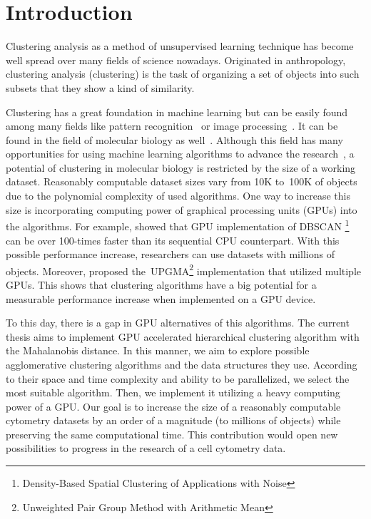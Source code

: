 \chapter*{Introduction}


Clustering analysis as a method of unsupervised learning technique has become well spread over many fields of science nowadays. Originated in anthropology, clustering analysis (clustering) is the task of organizing a set of objects into such subsets that they show a kind of similarity. 

Clustering has a great foundation in machine learning but can be easily found among many fields like pattern recognition~\cite{pare} or image processing~\cite{sathya2011image}. It can be found in the field of molecular biology as well~\cite{Nugent2010}. Although this field has many opportunities for using machine learning algorithms to advance the research~\cite{btaa091}, a potential of clustering in molecular biology is restricted by the size of a working dataset. Reasonably computable dataset sizes vary from 10K to~100K of objects due to the polynomial complexity of used algorithms. One way to increase this size is incorporating computing power of graphical processing units (GPUs) into the algorithms. For example, \citet{andrade2013g} showed that GPU implementation of DBSCAN \footnote{Density-Based Spatial Clustering of Applications with Noise} can be over 100-times faster than its sequential CPU counterpart. With this possible performance increase, researchers can use datasets with millions of objects. Moreover, \citet{hua2017mgupgma} proposed the~UPGMA\footnote{Unweighted Pair Group Method with Arithmetic Mean} implementation that utilized multiple GPUs. This shows that clustering algorithms have a big potential for a measurable performance increase when implemented on a GPU device.

To this day, there is a gap in GPU alternatives of this algorithms. The current thesis aims to implement GPU accelerated hierarchical clustering algorithm with the Mahalanobis distance. In this manner, we aim to explore possible agglomerative clustering algorithms and the data structures they use. According to their space and time complexity and ability to be parallelized, we select the most suitable algorithm. Then, we implement it utilizing a heavy computing power of a GPU. Our goal is to increase the size of a reasonably computable cytometry datasets by an order of a magnitude (to millions of objects) while preserving the same computational time. This contribution would open new possibilities to progress in the research of a cell cytometry data.

